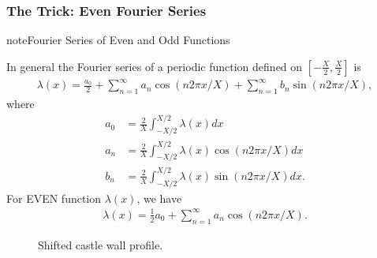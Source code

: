 \documentclass[letterpaper,12pt,english]{sphinxmanual}
\begin{document}


\subsubsection{The Trick: Even Fourier Series}
\label{\detokenize{matter-stimulated/parametric-resonance-revisted:the-trick-even-fourier-series}}
\begin{sphinxadmonition}{note}{Fourier Series of Even and Odd Functions}

In general the Fourier series of a periodic function defined on \(\left[ -\frac{X}{2}, \frac{X}{2} \right]\) is
\begin{equation*}
\begin{split}\lambda(x) = \frac{a_0}{2} + \sum_{n=1}^\infty a_n \cos(n 2\pi x/X) + \sum_{n=1}^\infty b_n \sin(n 2\pi x/X),\end{split}
\end{equation*}
where
\begin{equation*}
\begin{split}a_0 & = \frac{2}{X} \int^{X/2}_{-X/2} \lambda(x) d x \\
a_n & = \frac{2}{X} \int_{-X/2}^{X/2} \lambda(x) \cos ( n2\pi x/X ) dx\\
b_n & = \frac{2}{X} \int_{-X/2}^{X/2} \lambda(x) \sin( n 2\pi x/X ) dx.\end{split}
\end{equation*}
For EVEN function \(\lambda(x)\), we have
\begin{equation*}
\begin{split}\lambda(x) = \frac{1}{2}a_0 + \sum_{n=1}^\infty a_n \cos (n 2\pi x/X).\end{split}
\end{equation*}\end{sphinxadmonition}
\begin{figure}[htbp]
\centering
\capstart

\noindent{}
\caption{Shifted castle wall profile.}\label{\detokenize{matter-stimulated/parametric-resonance-revisted:id4}}\end{figure}
\end{document}

